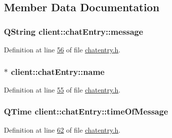 \subsection{Member Data Documentation}
\hypertarget{classclient_1_1chat_entry_acfae1b7b634153673eae05866945cba8}{
\subsubsection[{message}]{\setlength{\rightskip}{0pt plus 5cm}Q\-String client\-::chat\-Entry\-::message\hspace{0.3cm}{\ttfamily [private]}}}\label{d5/dfb/classclient_1_1chat_entry_acfae1b7b634153673eae05866945cba8}


Definition at line \hyperlink{chatentry_8h_source_l00056}{56} of file \hyperlink{chatentry_8h_source}{chatentry.\-h}.

\hypertarget{classclient_1_1chat_entry_a6e879b3384d8fc7ba149709a370e6d60}{
\subsubsection[{name}]{$\ast$ client\-::chat\-Entry\-::name\hspace{0.3cm}{\ttfamily [private]}}}\label{d5/dfb/classclient_1_1chat_entry_a6e879b3384d8fc7ba149709a370e6d60}


Definition at line \hyperlink{chatentry_8h_source_l00055}{55} of file \hyperlink{chatentry_8h_source}{chatentry.\-h}.

\hypertarget{classclient_1_1chat_entry_a935d9a9755f8c46eb97723ba296c2b30}{
\subsubsection[{time\-Of\-Message}]{\setlength{\rightskip}{0pt plus 5cm}Q\-Time client\-::chat\-Entry\-::time\-Of\-Message\hspace{0.3cm}{\ttfamily [private]}}}\label{d5/dfb/classclient_1_1chat_entry_a935d9a9755f8c46eb97723ba296c2b30}


Definition at line \hyperlink{chatentry_8h_source_l00062}{62} of file \hyperlink{chatentry_8h_source}{chatentry.\-h}.


